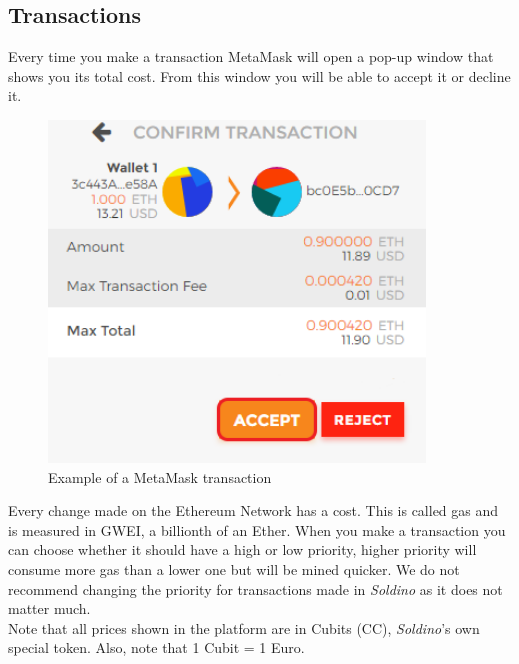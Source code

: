 	\subsection{Transactions}
	Every time you make a transaction MetaMask will open a pop-up window that 
	shows you its total cost.
	From this window you will be able to accept it or decline it.\\
	\begin{figure}[H]
		\includegraphics[width=10cm]{res/images/metamask_transaction.png}
		\centering
		\caption{Example of a MetaMask transaction}
	\end{figure}
	\noindent 
	Every change made on the Ethereum Network has a cost. This is called gas 
	and is measured in GWEI, a billionth of an Ether. When you make a 
	transaction you can choose whether it should have a high or low priority, 
	higher priority will consume more gas than a lower one but will be mined 
	quicker. We do not recommend changing the priority for transactions made 
	in \textit{Soldino} as it does not matter much.\\
	Note that all prices shown in the platform are in Cubits (CC), 
	\textit{Soldino}'s own special token. Also, note that 1 Cubit = 1 Euro.
